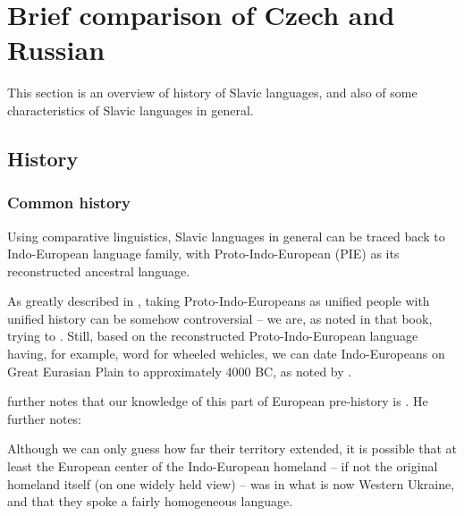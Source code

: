 \chapter{Brief comparison of Czech and Russian}

This section is an overview of history of Slavic languages, and also of some characteristics of Slavic languages in general.


\section{History}


\subsection{Common history}

\label{ch:common_history}

Using comparative linguistics, Slavic languages in general can be traced back to Indo-European language family, with Proto-Indo-European (PIE) as its reconstructed ancestral language. 

As greatly described in \cite{oxfordintro}, taking Proto-Indo-Europeans as unified people with unified history can be somehow controversial -- we are, as noted in that book, trying to . Still, based on the reconstructed Proto-Indo-European language having, for example, word for wheeled wehicles, we can date Indo-Europeans on Great Eurasian Plain to approximately 4000 BC, as noted by \cite{sussex2011slavic}.

\cite{sussex2011slavic} further notes that our knowledge of this part of European pre-history is . He further notes:

\begin{quotee}Although we can only guess how far their territory extended, it is possible that at least the European center of the Indo-European homeland -- if
not the original homeland itself (on one widely held view) -- was in what is now Western Ukraine, and that they spoke a fairly homogeneous language.\end{quotee}

